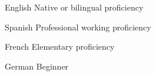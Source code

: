 
\begin{cvskills}
    \cvskill
    {English} %
    {Native or bilingual proficiency} %
    
    \cvskill
    {Spanish} %
    {Professional working proficiency} %
    
    \cvskill
    {French} %
    {Elementary proficiency} %
    
    \cvskill
    {German} %
    {Beginner} %
\end{cvskills}

\vspace{-5mm} %
